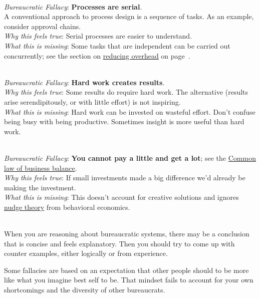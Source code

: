 \ \\
\textit{Bureaucratic Fallacy}: \textbf{Processes are serial}.\\
A conventional approach to process design is a sequence of tasks. As an example, consider approval chains. \\
\textit{Why this feels true}: Serial processes are easier to understand. \\
\textit{What this is missing}: Some tasks that are independent can be carried out concurrently; see the section on \hyperref[sec:reducing-overhead]{reducing overhead} on
page~\pageref{sec:reducing-overhead}.

\ \\
\textit{Bureaucratic Fallacy}: \textbf{Hard work creates results}.\\
\textit{Why this feels true}: Some results do require hard work. The alternative (results arise serendipitously, or with little effort) is not inspiring. \\
\textit{What this is missing}: Hard work can be invested on wasteful effort. Don't confuse being busy with being productive. Sometimes insight is more useful than hard work. 





\ \\
\textit{Bureaucratic Fallacy}: 
\textbf{You cannot pay a little and get a lot}; see the \href{https://en.wikipedia.org/wiki/Common_law_of_business_balance}{Common law of business balance}. 
 \\
\textit{Why this feels true}: If small investments made a big difference we'd already be making the investment.\\
\textit{What this is missing}: This doesn't account for creative solutions and ignores \href{https://en.wikipedia.org/wiki/Nudge_theory}{nudge theory} from behavioral economics. 

\ \\

When you are reasoning about bureaucratic systems, there may be a conclusion that is concise and feels explanatory. Then you should try to come up with counter examples, either logically or from experience.  

Some fallacies are based on an expectation that other people should to be more like what you imagine best self to be. That mindset fails to account for your own shortcomings and the diversity of other bureaucrats. 


